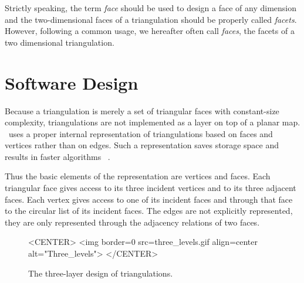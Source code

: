 Strictly speaking, the term {\em face} should be used
to design  a face of any dimension
and the two-dimensional faces of a triangulation 
should be properly called {\em facets}.
However, following a common usage, we hereafter often call {\em
faces}, the facets
of a two dimensional triangulation.




\section{Software Design}
\label{Section_2D_Triangulations_Software_Design}

Because a triangulation is merely a set of
triangular faces with constant-size complexity,
triangulations are not implemented
as a layer on top of a planar map.
\cgal\ uses a proper internal
representation of triangulations based on faces and vertices
rather than on edges. Such a  representation
saves storage space and results in faster
algorithms~ \cite{bdty-tcgal-00}.

Thus the basic elements of the representation are vertices and faces.
Each triangular face gives access to its three incident vertices 
and to its three adjacent faces. 
Each vertex gives access to one of its incident faces
and through that face to the circular list of its incident faces.
The edges are not explicitly represented, they are only represented 
through the adjacency relations of two faces.

\begin{figure}
\begin{ccTexOnly}
\begin{center}

\end{center}
\end{ccTexOnly}
\caption{The three-layer design of triangulations.
\label{I1_Fig_three_levels}}
\begin{ccHtmlOnly}
<CENTER>
<img border=0 src=three_levels.gif align=center alt="Three_levels">
</CENTER>
\end{ccHtmlOnly}
\end{figure}


